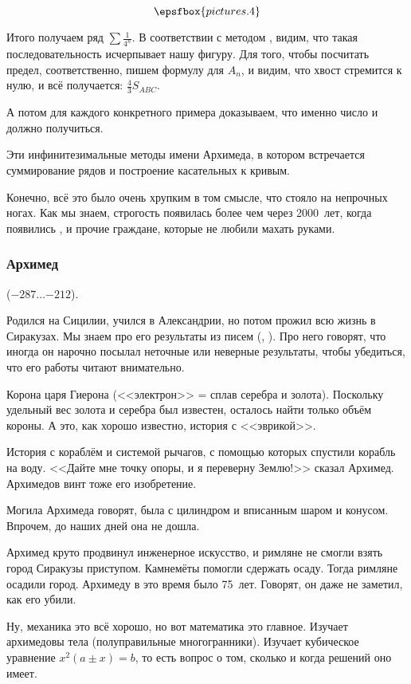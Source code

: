 \documentclass[a4paper,oneside,fleqn,10pt]{article}
\newcommand{\pe}[2]{${#1}\ldots{#2}$}
\newcommand{\cpic}[1]{$$\epsfbox{pictures.#1}$$}
\begin{document}
 \cpic{4}

Итого получаем ряд $\sum\frac{1}{4^n}$. В соответствии с методом
, видим, что такая последовательность
исчерпывает нашу фигуру. Для того, чтобы посчитать предел,
соответственно, пишем формулу для $A_n$, и видим, что хвост стремится
к нулю, и всё получается: $\frac43S_{ABC}$.

А потом для каждого конкретного примера доказываем, что именно число и
должно получиться.

Эти инфинитезимальные методы имени Архимеда, в котором встречается
суммирование рядов и построение касательных к кривым.

Конечно, всё это было очень хрупким в том смысле, что стояло на
непрочных ногах.  Как мы знаем, строгость появилась более чем через
2000~лет, когда появились ,  и прочие
граждане, которые не любили махать руками.

\subsubsection{Архимед}

 (\pe{-287}{-212}).

Родился на Сицилии, учился в Александрии, но потом прожил всю жизнь в
Сиракузах.  Мы знаем про его результаты из писем (,
). Про него говорят, что иногда он нарочно посылал
неточные или неверные результаты, чтобы убедиться, что его работы
читают внимательно.

Корона царя Гиерона (<<электрон>> = сплав серебра и золота). Поскольку
удельный вес золота и серебра был известен, осталось найти только
объём короны. А это, как хорошо известно, история с <<эврикой>>.

История с кораблём и системой рычагов, с помощью которых спустили
корабль на воду.  <<Дайте мне точку опоры, и я переверну Землю!>>
сказал Архимед.  Архимедов винт тоже его изобретение.

Могила Архимеда говорят, была с цилиндром и вписанным шаром и конусом.
Впрочем, до наших дней она не дошла.

Архимед круто продвинул инженерное искусство, и римляне не смогли
взять город Сиракузы приступом.  Камнемёты помогли сдержать
осаду. Тогда римляне осадили город.  Архимеду в это время было
75~лет. Говорят, он даже не заметил, как его убили.

Ну, механика это всё хорошо, но вот математика это главное.  Изучает
архимедовы тела (полуправильные многогранники).  Изучает кубическое
уравнение $x^2 (a\pm x) = b$, то есть вопрос о том, сколько и когда
решений оно имеет.
\end{document}
